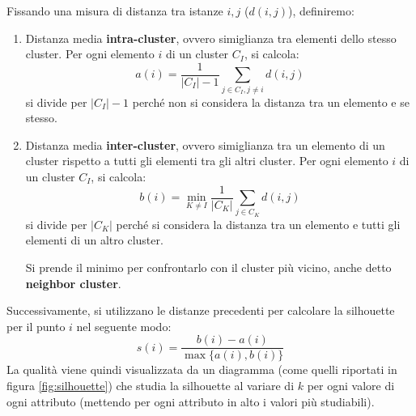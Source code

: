 Fissando una misura di distanza tra istanze $i, j$ ($d(i, j)$), definiremo:
\begin{enumerate}
      \item Distanza media \textbf{intra-cluster}, ovvero simiglianza tra
            elementi dello stesso cluster. Per ogni elemento $i$ di un cluster
            $C_I$, si calcola:
            \begin{equation}
                  a(i) = \frac{1}{|C_I| - 1} \sum_{j \in C_I, j \neq i} d(i, j)
            \end{equation}
            si divide per $|C_I| - 1 $ perché non si considera la distanza tra
            un elemento e se stesso.
      \item Distanza media \textbf{inter-cluster}, ovvero simiglianza tra un
            elemento di un cluster rispetto a tutti gli elementi tra gli altri
            cluster.  Per ogni elemento $i$ di un cluster $C_I$, si calcola:
            \begin{equation}
                  b(i) = \min_{K \neq I} \frac{1}{|C_K|} \sum_{j \in C_K} d(i, j)
            \end{equation}
            si divide per $|C_K|$ perché si considera la distanza tra un elemento
            e tutti gli elementi di un altro cluster.

            Si prende il minimo per confrontarlo con il cluster più vicino, anche
            detto \textbf{neighbor cluster}.
\end{enumerate}
Successivamente, si utilizzano le distanze precedenti per calcolare la silhouette 
per il punto $i$ nel seguente modo:
\begin{equation}
      s(i) = \frac{b(i) - a(i)}{\max\{a(i), b(i)\}}
\end{equation}
La qualità viene quindi visualizzata da un diagramma (come quelli riportati in
figura \ref{fig:silhouette}) che studia la silhouette al variare di $k$ per ogni
valore di ogni attributo (mettendo per ogni attributo in alto i valori più
studiabili).
